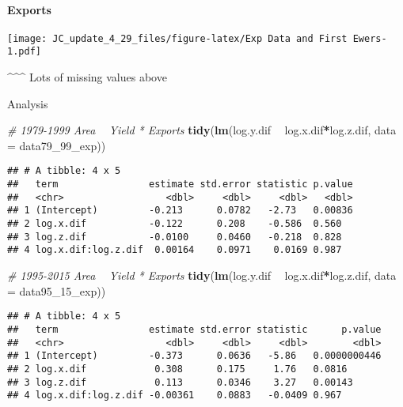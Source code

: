 \documentclass[
]{article}
\newenvironment{Shaded}{\begin{snugshade}}{\end{snugshade}}
\newcommand{\CommentTok}[1]{\textcolor[rgb]{0.56,0.35,0.01}{\textit{#1}}}
\newcommand{\DataTypeTok}[1]{\textcolor[rgb]{0.13,0.29,0.53}{#1}}
\newcommand{\DecValTok}[1]{\textcolor[rgb]{0.00,0.00,0.81}{#1}}
\newcommand{\KeywordTok}[1]{\textcolor[rgb]{0.13,0.29,0.53}{\textbf{#1}}}
\newcommand{\NormalTok}[1]{#1}
\newcommand{\OperatorTok}[1]{\textcolor[rgb]{0.81,0.36,0.00}{\textbf{#1}}}
\newcommand{\StringTok}[1]{\textcolor[rgb]{0.31,0.60,0.02}{#1}}
\begin{document}
\hypertarget{exports}{%
\paragraph{Exports}\label{exports}}

\texttt{[image: JC\_update\_4\_29\_files/figure-latex/Exp Data and First Ewers-1.pdf]}

\^{}\^{}\^{} Lots of missing values above

Analysis

\begin{Shaded}
\begin{Highlighting}[]
\CommentTok{# 1979-1999 Area ~ Yield * Exports}
\KeywordTok{tidy}\NormalTok{(}\KeywordTok{lm}\NormalTok{(log.y.dif }\OperatorTok{~}\StringTok{ }\NormalTok{log.x.dif}\OperatorTok{*}\NormalTok{log.z.dif, }\DataTypeTok{data =}\NormalTok{ data79_}\DecValTok{99}\NormalTok{_exp))}
\end{Highlighting}
\end{Shaded}

\begin{verbatim}
## # A tibble: 4 x 5
##   term                estimate std.error statistic p.value
##   <chr>                  <dbl>     <dbl>     <dbl>   <dbl>
## 1 (Intercept)         -0.213      0.0782   -2.73   0.00836
## 2 log.x.dif           -0.122      0.208    -0.586  0.560  
## 3 log.z.dif           -0.0100     0.0460   -0.218  0.828  
## 4 log.x.dif:log.z.dif  0.00164    0.0971    0.0169 0.987
\end{verbatim}

\begin{Shaded}
\begin{Highlighting}[]
\CommentTok{# 1995-2015 Area ~ Yield * Exports}
\KeywordTok{tidy}\NormalTok{(}\KeywordTok{lm}\NormalTok{(log.y.dif }\OperatorTok{~}\StringTok{ }\NormalTok{log.x.dif}\OperatorTok{*}\NormalTok{log.z.dif, }\DataTypeTok{data =}\NormalTok{ data95_}\DecValTok{15}\NormalTok{_exp))}
\end{Highlighting}
\end{Shaded}

\begin{verbatim}
## # A tibble: 4 x 5
##   term                estimate std.error statistic      p.value
##   <chr>                  <dbl>     <dbl>     <dbl>        <dbl>
## 1 (Intercept)         -0.373      0.0636   -5.86   0.0000000446
## 2 log.x.dif            0.308      0.175     1.76   0.0816      
## 3 log.z.dif            0.113      0.0346    3.27   0.00143     
## 4 log.x.dif:log.z.dif -0.00361    0.0883   -0.0409 0.967
\end{verbatim}
\end{document}

